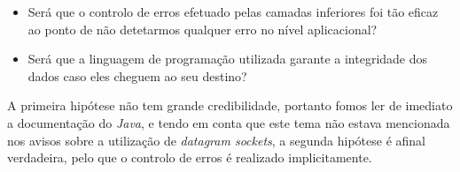         \begin{itemize}
            
            \item Será que o controlo de erros efetuado pelas camadas inferiores foi tão eficaz ao ponto de não detetarmos qualquer erro no nível aplicacional?

            \item Será que a linguagem de programação utilizada garante a integridade dos dados caso eles cheguem ao seu destino?

        \end{itemize}

        A primeira hipótese não tem grande credibilidade, portanto fomos ler de imediato a documentação do \textit{Java}, e tendo em conta que este tema não estava mencionada nos avisos sobre a utilização de \textit{datagram sockets}, a segunda hipótese é afinal verdadeira, pelo que o controlo de erros é realizado implicitamente.